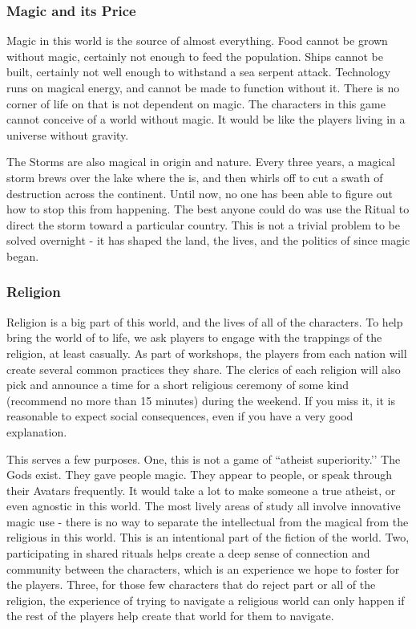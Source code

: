 \documentclass[sheet]{GL2020}
\begin{document}
\subsubsection{Magic and its Price}
Magic in this world is the source of almost everything. Food cannot be grown without magic, certainly not enough to feed the population. Ships cannot be built, certainly not well enough to withstand a sea serpent attack. Technology runs on magical energy, and cannot be made to function without it. There is no corner of life on \pEarth{} that is not dependent on magic. The characters in this game cannot conceive of a world without magic. It would be like the players living in a universe without gravity.

The Storms are also magical in origin and nature. Every three years, a magical storm brews over the lake where the \pSc{} is, and then whirls off to cut a swath of destruction across the continent. Until now, no one has been able to figure out how to stop this from happening. The best anyone could do was use the Ritual to direct the storm toward a particular country. This is not a trivial problem to be solved overnight - it has shaped the land, the lives, and the politics of \pEarth{} since magic began.

\subsubsection{Religion}
Religion is a big part of this world, and the lives of all of the characters. To help bring the world of \pEarth{} to life, we ask players to engage with the trappings of the religion, at least casually. As part of workshops, the players from each nation will create several common practices they share. The clerics of each religion will also pick and announce a time for a short religious ceremony of some kind (recommend no more than 15 minutes) during the weekend. If you miss it, it is reasonable to expect social consequences, even if you have a very good explanation.

This serves a few purposes. One, this is not a game of ``atheist superiority.’’ The Gods exist. They gave people magic. They appear to people, or speak through their Avatars frequently. It would take a lot to make someone a true atheist, or even agnostic in this world. The most lively areas of study all involve innovative magic use - there is no way to separate the intellectual from the magical from the religious in this world. This is an intentional part of the fiction of the world. Two, participating in shared rituals helps create a deep sense of connection and community between the characters, which is an experience we hope to foster for the players. Three, for those few characters that do reject part or all of the religion, the experience of trying to navigate a religious world can only happen if the rest of the players help create that world for them to navigate.
\end{document}
